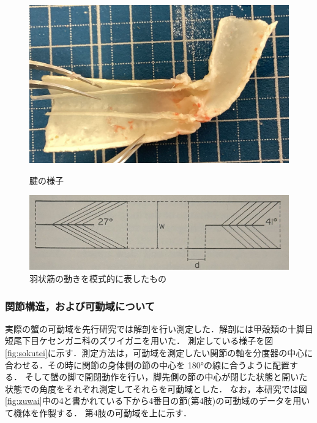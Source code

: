 \begin{figure}[t]
  \begin{minipage}[b]{0.39\hsize}
    \centering
    \includegraphics[scale=0.1]{image/setukanmaku.jpg}
    \caption{腱の様子\cite{hasegawa}}
    \label{fig:ken}
  \end{minipage}
  \begin{minipage}[b]{0.6\hsize}
    \centering
    \includegraphics[scale=0.18]{image/ujo.JPG}
    \caption{羽状筋の動きを模式的に表したもの\cite{warner1977biology}}
    \label{fig:ujo}
  \end{minipage}
\end{figure}
\subsubsection{関節構造，および可動域について}


実際の蟹の可動域を先行研究では解剖を行い測定した．解剖には甲殻類の十脚目短尾下目ケセンガニ科のズワイガニを用いた．
測定している様子を図\ref{fig:sokutei}に示す．測定方法は，可動域を測定したい関節の軸を分度器の中心に合わせる．その時に関節の身体側の節の中心を 180°の線に合うように配置する．
そして蟹の脚で開閉動作を行い，脚先側の節の中心が閉じた状態と開いた状態での角度をそれぞれ測定してそれらを可動域とした．
なお，本研究では図\ref{fig:zuwai}中の4と書かれている下から4番目の節(第4肢)の可動域のデータを用いて機体を作製する．
第4肢の可動域を上に示す．
